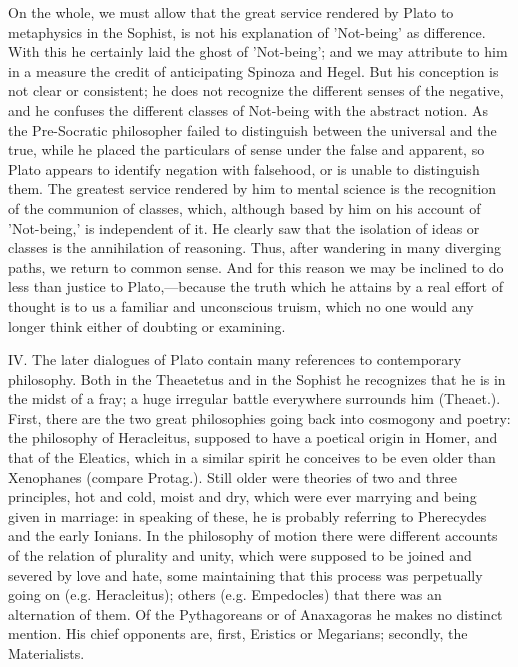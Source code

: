 \documentclass[11pt,letter]{article}
\begin{document}
\par  On the whole, we must allow that the great service rendered by Plato to metaphysics in the Sophist, is not his explanation of 'Not-being' as difference. With this he certainly laid the ghost of 'Not-being'; and we may attribute to him in a measure the credit of anticipating Spinoza and Hegel. But his conception is not clear or consistent; he does not recognize the different senses of the negative, and he confuses the different classes of Not-being with the abstract notion. As the Pre-Socratic philosopher failed to distinguish between the universal and the true, while he placed the particulars of sense under the false and apparent, so Plato appears to identify negation with falsehood, or is unable to distinguish them. The greatest service rendered by him to mental science is the recognition of the communion of classes, which, although based by him on his account of 'Not-being,' is independent of it. He clearly saw that the isolation of ideas or classes is the annihilation of reasoning. Thus, after wandering in many diverging paths, we return to common sense. And for this reason we may be inclined to do less than justice to Plato,—because the truth which he attains by a real effort of thought is to us a familiar and unconscious truism, which no one would any longer think either of doubting or examining.

\par  IV. The later dialogues of Plato contain many references to contemporary philosophy. Both in the Theaetetus and in the Sophist he recognizes that he is in the midst of a fray; a huge irregular battle everywhere surrounds him (Theaet.). First, there are the two great philosophies going back into cosmogony and poetry: the philosophy of Heracleitus, supposed to have a poetical origin in Homer, and that of the Eleatics, which in a similar spirit he conceives to be even older than Xenophanes (compare Protag.). Still older were theories of two and three principles, hot and cold, moist and dry, which were ever marrying and being given in marriage: in speaking of these, he is probably referring to Pherecydes and the early Ionians. In the philosophy of motion there were different accounts of the relation of plurality and unity, which were supposed to be joined and severed by love and hate, some maintaining that this process was perpetually going on (e.g. Heracleitus); others (e.g. Empedocles) that there was an alternation of them. Of the Pythagoreans or of Anaxagoras he makes no distinct mention. His chief opponents are, first, Eristics or Megarians; secondly, the Materialists.
\end{document}
